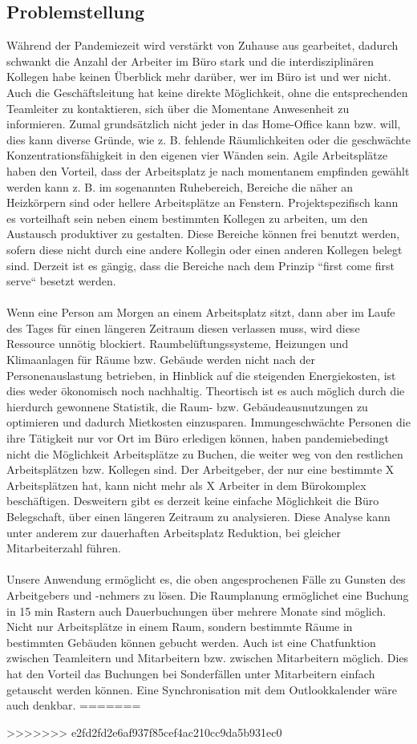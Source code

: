 \documentclass{article}
\begin{document}
\subsection{Problemstellung}
Während der Pandemiezeit wird verstärkt von Zuhause aus gearbeitet, dadurch schwankt die Anzahl der Arbeiter im Büro
stark und die interdisziplinären Kollegen habe keinen Überblick mehr darüber, wer im Büro ist und wer nicht.
Auch die Geschäftsleitung hat keine direkte Möglichkeit, ohne die entsprechenden Teamleiter zu kontaktieren, sich über 
die Momentane Anwesenheit zu informieren.
Zumal grundsätzlich nicht jeder in das Home-Office kann bzw. will, dies kann diverse Gründe, wie z. B. fehlende
Räumlichkeiten oder die geschwächte Konzentrationsfähigkeit in den eigenen vier Wänden sein. Agile Arbeitsplätze
haben den Vorteil, dass der Arbeitsplatz je nach momentanem empfinden gewählt werden kann z. B. im sogenannten Ruhebereich,
Bereiche die näher an Heizkörpern sind oder hellere Arbeitsplätze an Fenstern. Projektspezifisch kann es vorteilhaft sein
neben einem bestimmten Kollegen zu arbeiten, um den Austausch produktiver zu gestalten. Diese Bereiche können frei benutzt werden,
sofern diese nicht durch eine andere Kollegin oder einen anderen Kollegen belegt sind. Derzeit ist es gängig, dass die Bereiche nach
dem Prinzip “first come first serve“ besetzt werden.\\\\
Wenn eine Person am Morgen an einem Arbeitsplatz sitzt, dann aber im Laufe des Tages für einen längeren Zeitraum diesen verlassen muss,
wird diese Ressource unnötig blockiert. Raumbelüftungssysteme, Heizungen und Klimaanlagen für Räume bzw. Gebäude werden nicht
nach der Personenauslastung betrieben, in Hinblick auf die steigenden Energiekosten, ist dies weder ökonomisch noch nachhaltig.
Theortisch ist es auch möglich durch die hierdurch gewonnene Statistik, die Raum- bzw. Gebäudeausnutzungen zu optimieren
und dadurch Mietkosten einzusparen.
Immungeschwächte Personen die ihre Tätigkeit nur vor Ort im Büro erledigen können, haben pandemiebedingt nicht die Möglichkeit
Arbeitsplätze zu Buchen, die weiter weg von den restlichen Arbeitsplätzen bzw. Kollegen sind. Der Arbeitgeber, der nur eine bestimmte
X Arbeitsplätzen hat, kann nicht mehr als X Arbeiter in dem Bürokomplex beschäftigen. Desweitern gibt es derzeit keine einfache Möglichkeit
die Büro Belegschaft, über einen längeren Zeitraum zu analysieren. Diese Analyse kann unter anderem zur dauerhaften Arbeitsplatz Reduktion,
bei gleicher Mitarbeiterzahl führen.\\\\
Unsere Anwendung ermöglicht es, die oben angesprochenen Fälle zu Gunsten des Arbeitgebers und -nehmers zu lösen. 
Die Raumplanung ermöglichet eine Buchung in 15 min Rastern auch Dauerbuchungen über mehrere Monate sind möglich. 
Nicht nur Arbeitsplätze in einem Raum, sondern bestimmte Räume in bestimmten Gebäuden können gebucht werden. 
Auch ist eine Chatfunktion zwischen Teamleitern und Mitarbeitern bzw. zwischen Mitarbeitern möglich. 
Dies hat den Vorteil das Buchungen bei Sonderfällen unter Mitarbeitern einfach getauscht werden können. 
Eine Synchronisation mit dem Outlookkalender wäre auch denkbar.
=======



>>>>>>> e2fd2fd2e6af937f85cef4ac210cc9da5b931ec0



% 


\end{document}
